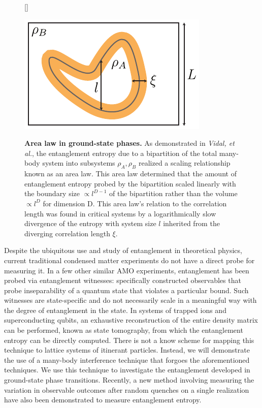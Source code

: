 \begin{figure}
[\FBwidth]
{\caption{\textbf{Area law in ground-state phases.} As demonstrated in \emph{Vidal, et al.}, the entanglement entropy due to a bipartition of the total many-body system into subsystems $\rho_A,\rho_B$ realized a scaling relationship known as an area law. This area law determined that the amount of entanglement entropy probed by the bipartition scaled linearly with the boundary size $\propto l^{D-1}$ of the bipartition rather than the volume $\propto l^D$ for dimension D. This area law's relation to the correlation length was found in critical systems by a logarithmically slow divergence of the entropy with system size $l$ inherited from the diverging correlation length $\xi$.} \label{fig:areaLaw}}
{\includegraphics[width=3 in]{figures/ch3/philipp_area_law_cartoon.pdf} } 
\end{figure}

Despite the ubiquitous use and study of entanglement in theoretical physics, current traditional condensed matter experiments do not have a direct probe for measuring it. In a few other similar AMO experiments, entanglement has been probed via entanglement witnesses\cite{Bouwmeester1999}: specifically constructed observables that probe inseparability of a quantum state that violates a particular bound.  Such witnesses are state-specific and do not necessarily scale in a meaningful way with the degree of entanglement in the state. In systems of trapped ions\cite{Haffner2005} and superconducting qubits\cite{Neill2016}, an exhaustive reconstruction of the entire density matrix can be performed, known as state tomography, from which the entanglement entropy can be directly computed. There is not a know scheme for mapping this technique to lattice systems of itinerant particles. Instead, we will demonstrate the use of a many-body interference technique that forgoes the aforementioned techniques. We use this technique to investigate the entanglement developed in ground-state phase transitions\cite{Ekert2002,Moura2004,Palmer2005,Daley2012}. Recently, a new method involving measuring the variation in observable outcomes after random quenches on a single realization have also been demonstrated to measure entanglement entropy\cite{Brydges2019}.

